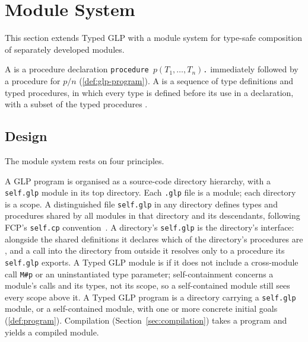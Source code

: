 \section{Module System}
\label{sec:modules}

This section extends Typed GLP with a module system for type-safe composition of separately developed modules.

\begin{definition}
\label{def:module}
A  is a procedure declaration \verb|procedure |$p(T_1,\ldots,T_n)$\verb|.| immediately followed by a procedure for $p/n$ (\cref{def:glp-program}).  A  is a sequence of type definitions and typed procedures, in which every type is defined before its use in a declaration, with a subset of the typed procedures .
\end{definition}

\subsection{Design}
\label{sec:mod-design}

The module system rests on four principles.

A GLP program is organised as a source-code directory hierarchy, with a \verb|self.glp| module in its top directory.  Each \verb|.glp| file is a module; each directory is a scope.  A distinguished file \verb|self.glp| in any directory defines types and procedures shared by all modules in that directory and its descendants, following FCP's \verb|self.cp| convention~\cite{silverman1988logix}.  A directory's \verb|self.glp| is the directory's interface: alongside the shared definitions it declares which of the directory's procedures are , and a call into the directory from outside it resolves only to a procedure its \verb|self.glp| exports.  A Typed GLP module is  if it does not include a cross-module call \verb|M#p| or an uninstantiated type parameter; self-containment concerns a module's calls and its types, not its scope, so a self-contained module still sees every scope above it.  A Typed GLP program is a directory carrying a \verb|self.glp| module, or a self-contained module, with one or more concrete initial goals (\cref{def:program}).  Compilation (Section~\ref{sec:compilation}) takes a program and yields a compiled module.

